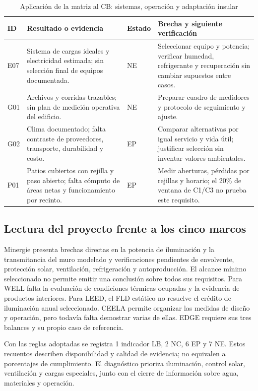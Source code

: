 \begin{table}[H]\centering\caption{Aplicación de la matriz al CB: sistemas, operación y adaptación insular}
{\fontsize{10}{12.5}\selectfont\singlespacing\renewcommand{\arraystretch}{1.3}\setlength{\tabcolsep}{4pt}\begin{tabular}{>{\raggedright\arraybackslash}p{0.8cm}>{\raggedright\arraybackslash}p{5.5cm}>{\raggedright\arraybackslash}p{1.4cm}>{\raggedright\arraybackslash}p{6.2cm}}\toprule ID & Resultado o evidencia & Estado & Brecha y siguiente verificación \\ \midrule
E07 & Sistema de cargas ideales y electricidad estimada; sin selección final de equipos documentada. & NE & Seleccionar equipo y potencia; verificar humedad, refrigerante y recuperación sin cambiar supuestos entre casos. \\[5pt]
G01 & Archivos y corridas trazables; sin plan de medición operativa del edificio. & NE & Preparar cuadro de medidores y protocolo de seguimiento y ajuste. \\[5pt]
G02 & Clima documentado; falta contraste de proveedores, transporte, durabilidad y costo. & EP & Comparar alternativas por igual servicio y vida útil; justificar selección sin inventar valores ambientales. \\[5pt]
P01 & Patios cubiertos con rejilla y paso abierto; falta cómputo de áreas netas y funcionamiento por recinto. & EP & Medir aberturas, pérdidas por rejillas y horario; el 20\% de ventana de C1/C3 no prueba este requisito. \\[5pt]
\bottomrule\end{tabular}}\end{table}\par\medskip
\subsection{Lectura del proyecto frente a los cinco marcos}
Minergie presenta brechas directas en la potencia de iluminación y la transmitancia del muro modelado y verificaciones pendientes de envolvente, protección solar, ventilación, refrigeración y autoproducción. El alcance mínimo seleccionado no permite emitir una conclusión sobre todos sus requisitos. Para WELL falta la evaluación de condiciones térmicas ocupadas y la evidencia de productos interiores. Para LEED, el FLD estático no resuelve el crédito de iluminación anual seleccionado. CEELA permite organizar las medidas de diseño y operación, pero todavía falta demostrar varias de ellas. EDGE requiere sus tres balances y su propio caso de referencia.

Con las reglas adoptadas se registra 1 indicador LB, 2 NC, 6 EP y 7 NE. Estos recuentos describen disponibilidad y calidad de evidencia; no equivalen a porcentajes de cumplimiento. El diagnóstico prioriza iluminación, control solar, ventilación y cargas especiales, junto con el cierre de información sobre agua, materiales y operación.
